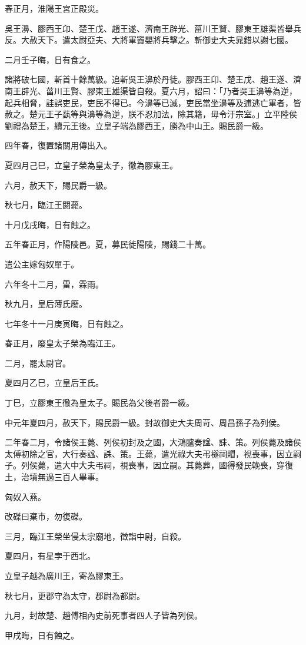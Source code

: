 \begin{pinyinscope}
春正月，淮陽王宮正殿災。

吳王濞、膠西王卬、楚王戊、趙王遂、濟南王辟光、菑川王賢、膠東王雄渠皆舉兵反。大赦天下。遣太尉亞夫、大將軍竇嬰將兵擊之。斬御史大夫晁錯以謝七國。

二月壬子晦，日有食之。

諸將破七國，斬首十餘萬級。追斬吳王濞於丹徒。膠西王卬、楚王戊、趙王遂、濟南王辟光、菑川王賢、膠東王雄渠皆自殺。夏六月，詔曰：「乃者吳王濞等為逆，起兵相脅，詿誤吏民，吏民不得已。今濞等已滅，吏民當坐濞等及逋逃亡軍者，皆赦之。楚元王子蓺等與濞等為逆，朕不忍加法，除其籍，毋令汙宗室。」立平陸侯劉禮為楚王，續元王後。立皇子端為膠西王，勝為中山王。賜民爵一級。

四年春，復置諸關用傳出入。

夏四月己巳，立皇子榮為皇太子，徹為膠東王。

六月，赦天下，賜民爵一級。

秋七月，臨江王閼薨。

十月戊戌晦，日有蝕之。

五年春正月，作陽陵邑。夏，募民徙陽陵，賜錢二十萬。

遣公主嫁匈奴單于。

六年冬十二月，雷，霖雨。

秋九月，皇后薄氏廢。

七年冬十一月庚寅晦，日有蝕之。

春正月，廢皇太子榮為臨江王。

二月，罷太尉官。

夏四月乙巳，立皇后王氏。

丁巳，立膠東王徹為皇太子。賜民為父後者爵一級。

中元年夏四月，赦天下，賜民爵一級。封故御史大夫周苛、周昌孫子為列侯。

二年春二月，令諸侯王薨、列侯初封及之國，大鴻臚奏諡、誄、策。列侯薨及諸侯太傅初除之官，大行奏諡、誄、策。王薨，遣光祿大夫弔襚祠賵，視喪事，因立嗣子。列侯薨，遣大中大夫弔祠，視喪事，因立嗣。其薨葬，國得發民輓喪，穿復土，治墳無過三百人畢事。

匈奴入燕。

改磔曰棄市，勿復磔。

三月，臨江王榮坐侵太宗廟地，徵詣中尉，自殺。

夏四月，有星孛于西北。

立皇子越為廣川王，寄為膠東王。

秋七月，更郡守為太守，郡尉為都尉。

九月，封故楚、趙傅相內史前死事者四人子皆為列侯。

甲戌晦，日有蝕之。


\end{pinyinscope}
